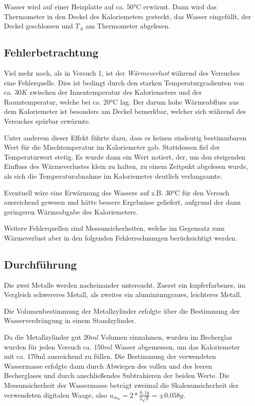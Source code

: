 \documentclass[
  9pt,
]{article}
\begin{document}
Wasser wird auf einer Heizplatte auf ca. 50°C erwärmt. Dann wird das
Thermometer in den Deckel des Kaloriemeters gesteckt, das Wasser
eingefüllt, der Deckel geschlossen und \(T_A\) am Thermometer abgelesen.

\hypertarget{fehlerbetrachtung-1}{%
\subsection{Fehlerbetrachtung}\label{fehlerbetrachtung-1}}

Viel mehr noch, als in Versuch 1, ist der \emph{Wärmeverlust} während
des Versuches eine Fehlerquelle. Dies ist bedingt durch den starken
Temperaturgradienten von ca. \(30K\) zwischen der Innentemperatur des
Kaloriemeters und der Raumtemperatur, welche bei ca. 20°C lag. Der darum
hohe Wärmeabfluss aus dem Kaloriemeter ist besonders am Deckel
bemerkbar, welcher sich während des Versuches spürbar erwärmte.

Unter anderem dieser Effekt führte dazu, dass es keinen eindeutig
bestimmbaren Wert für die Mischtemperatur im Kaloriemeter gab.
Stattdessen fiel der Temperaturwert stetig. Es wurde dann ein Wert
notiert, der, um den steigenden Einfluss des Wärmeverlustes klein zu
halten, zu einem Zeitpukt abgelesen wurde, als sich die
Temperaturabnahme im Kaloriemeter deutlich verlangsamte.

Eventuell wäre eine Erwärmung des Wassers auf z.B. 30°C für den Versuch
ausreichend gewesen und hätte bessere Ergebnisse geliefert, aufgrund der
dann geringeren Wärmeabgabe des Kaloriemeters.

Weitere Fehlerquellen sind Messunsicherheiten, welche im Gegensatz zum
Wärmeverlust aber in den folgenden Fehlerrechnungen berücksichtigt
werden.

\hypertarget{durchfuxfchrung}{%
\subsection{Durchführung}\label{durchfuxfchrung}}

Die zwei Metalle werden nacheinander untersucht. Zuerst ein
kupferfarbenes, im Vergleich schwereres Metall, als zweites ein
aluminiumgraues, leichteres Metall.

Die Volumenbestimmung der Metallzylinder erfolgte über die Bestimmung
der Wasserverdrängung in einem Standzylinder.

Da die Metallzylinder gut \(20ml\) Volumen einnahmen, wurden im
Becherglas wurden für jeden Versuch ca. \(150ml\) Wasser abgemessen, um
das Kaloriemeter mit ca. 170ml ausreichend zu füllen. Die Bestimmung der
verwendeten Wassermasse erfolgte dann durch Abwiegen des vollen und des
leeren Becherglases und durch anschließendes Subtrahieren der beiden
Werte. Die Messunsicherheit der Wassermasse beträgt zweimal die
Skalenunsicherheit der verwendeten digitalen Waage, also
\(u_{m_w}=2*\frac{0,1g}{2\sqrt{3}}=\pm0.058g\).
\end{document}

